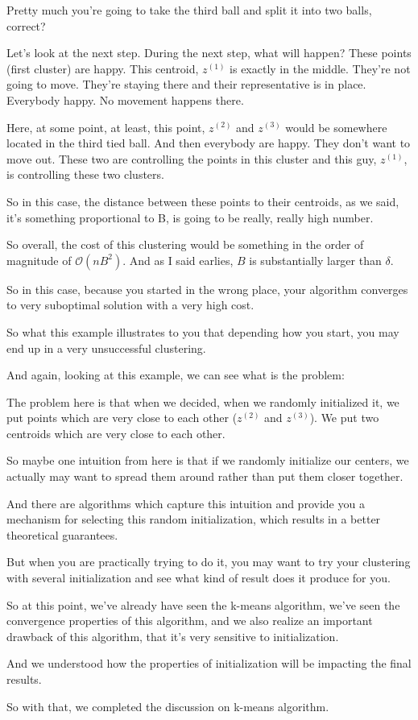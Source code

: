 \documentclass[a4paper, 12pt]{article}
\begin{document}
Pretty much you're going to take the third ball and split it into two balls,
correct?

Let's look at the next step. During the next step, what will happen? These
points (first cluster) are happy. This centroid, \(z^{(1)}\) is exactly in the
middle. They're not going to move. They're staying there and their
representative is in place. Everybody happy. No movement happens there.

Here, at some point, at least, this point, \(z^{(2)}\) and \(z^{(3)}\) would be
somewhere located in the third tied ball. And then everybody are happy. They
don't want to move out. These two are controlling the points in this cluster and
this guy, \(z^{(1)}\), is controlling these two clusters.

So in this case, the distance between these points to their centroids, as we
said, it's something proportional to B, is going to be really, really high
number.

So overall, the cost of this clustering would be something in the order of
magnitude of \(\mathcal{O}(nB^2)\). And as I said earlies, \(B\) is
substantially larger than \(\delta\).

So in this case, because you started in the wrong place, your algorithm
converges to very suboptimal solution with a very high cost.

So what this example illustrates to you that depending how you start, you may
end up in a very unsuccessful clustering.

And again, looking at this example, we can see what is the problem:

The problem here is that when we decided, when we randomly initialized it, we
put points which are very close to each other (\(z^{(2)}\) and \(z^{(3)}\)). We
put two centroids which are very close to each other.

So maybe one intuition from here is that if we randomly initialize our centers,
we actually may want to spread them around rather than put them closer together.

And there are algorithms which capture this intuition and provide you a
mechanism for selecting this random initialization, which results in a better
theoretical guarantees.

But when you are practically trying to do it, you may want to try your
clustering with several initialization and see what kind of result does it
produce for you.

So at this point, we've already have seen the k-means algorithm, we've seen the
convergence properties of this algorithm, and we also realize an important
drawback of this algorithm, that it's very sensitive to initialization.

And we understood how the properties of initialization will be impacting the
final results.

So with that, we completed the discussion on k-means algorithm.
\end{document}
